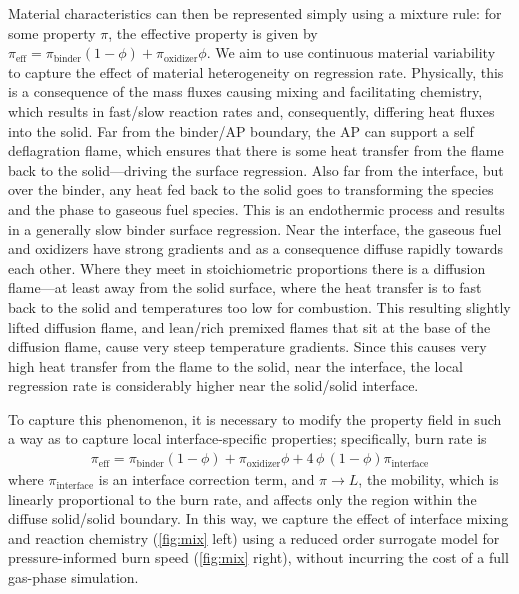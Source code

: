 \documentclass[colorinlistoftodos,review]{elsarticle}
\begin{document}
Material characteristics can then be represented simply using a mixture rule: for some property $\pi$, the effective property is given by $\pi_\mathrm{eff}=\pi_\mathrm{binder}(1-\phi) + \pi_\mathrm{oxidizer}\phi$. 
We aim to use continuous material variability to capture the effect of material heterogeneity on regression rate.
Physically, this is a consequence of the mass fluxes causing mixing and facilitating chemistry, which results in fast\slash slow reaction rates and, consequently, differing heat fluxes into the solid.
Far from the binder\slash AP boundary, the AP can support a self deflagration flame, which ensures that there is some heat transfer from the flame back to the solid---driving the surface regression.
Also far from the interface, but over the binder, any heat fed back to the solid goes to transforming the species and the phase to gaseous fuel species.
This is an endothermic process and results in a generally slow binder surface regression.
Near the interface, the gaseous fuel and oxidizers have strong gradients and as a consequence diffuse rapidly towards each other.
Where they meet in stoichiometric proportions there is a diffusion flame---at least away from the solid surface, where the heat transfer is to fast back to the solid and temperatures too low for combustion.
This resulting slightly lifted diffusion flame, and lean\slash rich premixed flames that sit at the base of the diffusion flame, cause very steep temperature gradients.
Since this causes very high heat transfer from the flame to the solid, near the interface, the local regression rate is considerably higher near the solid\slash solid interface.

To capture this phenomenon, it is necessary to modify the property field in such a way as to capture local interface-specific properties; specifically, burn rate is
\begin{align}
  \pi_\mathrm{eff}=\pi_{\mathrm{binder}}(1-\phi) + \pi_{\mathrm{oxidizer}}\phi + 4\,\phi\,(1-\phi) \pi_{\mathrm{interface}}
\end{align}
where $\pi_{\mathrm{interface}}$ is an interface correction term, and $\pi\to L$, the mobility, which is linearly proportional to the burn rate, and affects only the region within the diffuse solid\slash solid boundary.
In this way, we capture the effect of interface mixing and reaction chemistry (\cref{fig:mix} left) using a reduced order surrogate model for pressure-informed burn speed (\cref{fig:mix} right), without incurring the cost of a full gas-phase simulation.
\end{document}
